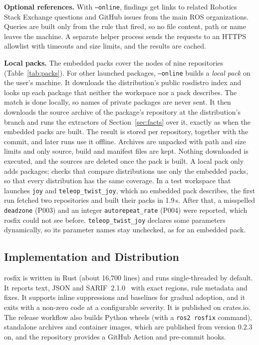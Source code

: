 \documentclass[conference]{IEEEtran}
\newcommand{\code}[1]{\texttt{#1}}
\begin{document}
\textbf{Optional references.} With \code{--online}, findings get links to related Robotics Stack
Exchange questions and GitHub issues from the main ROS organizations. Queries are built only from
the rule that fired, so no file content, path or name leaves the machine. A separate helper
process sends the requests to an HTTPS allowlist with timeouts and size limits, and the results
are cached.

\textbf{Local packs.} The embedded packs cover the nodes of nine repositories
(Table~\ref{tab:packs}). For other launched packages, \code{--online} builds a \emph{local pack}
on the user's machine. It downloads the distribution's public rosdistro index and looks up each
package that neither the workspace nor a pack describes. The match is done locally, so names of
private packages are never sent. It then downloads the source archive of the package's
repository at the distribution's branch and runs the extractors of Section~\ref{sec:facts} over
it, exactly as when the embedded packs are built. The result is stored per repository, together
with the commit, and later runs use it offline. Archives are unpacked with path and size limits
and only source, build and manifest files are kept. Nothing downloaded is executed, and the
sources are deleted once the pack is built. A local pack only adds packages; checks that
compare distributions use only the embedded packs, so that every distribution has the same
coverage. In a test workspace that launches \code{joy} and \code{teleop\_twist\_joy}, which no
embedded pack describes, the first run fetched two repositories and built their packs in
1.9\,s. After that, a misspelled \code{deadzone} (P003) and an integer \code{autorepeat\_rate}
(P004) were reported, which rosfix could not see before. \code{teleop\_twist\_joy} declares
some parameters dynamically, so its parameter names stay unchecked, as for an embedded pack.

\subsection{Implementation and Distribution}

rosfix is written in Rust (about 16{,}700 lines) and runs single-threaded by default. It reports
text, JSON and SARIF~2.1.0~\cite{sarif} with exact regions, rule metadata and fixes. It supports
inline suppressions and baselines for gradual adoption, and it exits with a non-zero code at a
configurable severity. It is published on crates.io. The release workflow also builds Python
wheels (with a \code{ros2 rosfix} command), standalone archives and container images, which are
published from version 0.2.3 on, and the repository provides a GitHub Action and pre-commit hooks.
\end{document}
